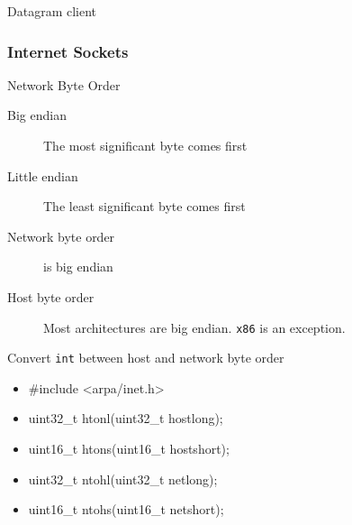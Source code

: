 \begin{frame}
  \begin{description}
  \item[Datagram client] 
  \end{description}

\end{frame}

\subsubsection{Internet Sockets}
\label{sec:internet-sockets}

\begin{frame}{Network Byte Order}
  \begin{description}
  \item[Big endian] The most significant byte comes first
  \item[Little endian] The least significant byte comes first
  \end{description}
  \begin{center}
  \end{center}
  \begin{description}
  \item[Network byte order] is big endian
  \item[Host byte order] Most architectures are big endian. \texttt{x86} is an exception.
  \end{description}
\end{frame}

\begin{frame}
  \begin{block}{Convert \texttt{int} between host and network byte order}
    \ttfamily
    \begin{itemize}
      \item[] \#include <arpa/inet.h>
      \item[] uint32\_t htonl(uint32\_t hostlong);
      \item[] uint16\_t htons(uint16\_t hostshort);
      \item[] uint32\_t ntohl(uint32\_t netlong);
      \item[] uint16\_t ntohs(uint16\_t netshort);
    \end{itemize}
  \end{block}
\end{frame}

